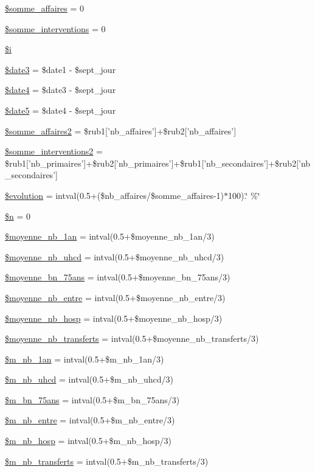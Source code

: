 \begin{CompactItemize}
\item 
\hyperlink{recueil__quotidien_8php_a13}{\$somme\_\-affaires} = 0
\item 
\hyperlink{recueil__quotidien_8php_a14}{\$somme\_\-interventions} = 0
\item 
\hyperlink{recueil__quotidien_8php_a15}{\$i}
\item 
\hyperlink{recueil__quotidien_8php_a16}{\$date3} = \$date1 - \$sept\_\-jour
\item 
\hyperlink{recueil__quotidien_8php_a17}{\$date4} = \$date3 - \$sept\_\-jour
\item 
\hyperlink{recueil__quotidien_8php_a18}{\$date5} = \$date4 - \$sept\_\-jour
\item 
\hyperlink{recueil__quotidien_8php_a19}{\$somme\_\-affaires2} = \$rub1\mbox{[}'nb\_\-affaires'\mbox{]}+\$rub2\mbox{[}'nb\_\-affaires'\mbox{]}
\item 
\hyperlink{recueil__quotidien_8php_a20}{\$somme\_\-interventions2} = \$rub1\mbox{[}'nb\_\-primaires'\mbox{]}+\$rub2\mbox{[}'nb\_\-primaires'\mbox{]}+\$rub1\mbox{[}'nb\_\-secondaires'\mbox{]}+\$rub2\mbox{[}'nb\_\-secondaires'\mbox{]}
\item 
\hyperlink{recueil__quotidien_8php_a21}{\$evolution} = intval(0.5+(\$nb\_\-affaires/\$somme\_\-affaires-1)$\ast$100).\char`\"{} \%\char`\"{}
\item 
\hyperlink{recueil__quotidien_8php_a22}{\$n} = 0
\item 
\hyperlink{recueil__quotidien_8php_a23}{\$moyenne\_\-nb\_\-1an} = intval(0.5+\$moyenne\_\-nb\_\-1an/3)
\item 
\hyperlink{recueil__quotidien_8php_a24}{\$moyenne\_\-nb\_\-uhcd} = intval(0.5+\$moyenne\_\-nb\_\-uhcd/3)
\item 
\hyperlink{recueil__quotidien_8php_a25}{\$moyenne\_\-bn\_\-75ans} = intval(0.5+\$moyenne\_\-bn\_\-75ans/3)
\item 
\hyperlink{recueil__quotidien_8php_a26}{\$moyenne\_\-nb\_\-entre} = intval(0.5+\$moyenne\_\-nb\_\-entre/3)
\item 
\hyperlink{recueil__quotidien_8php_a27}{\$moyenne\_\-nb\_\-hosp} = intval(0.5+\$moyenne\_\-nb\_\-hosp/3)
\item 
\hyperlink{recueil__quotidien_8php_a28}{\$moyenne\_\-nb\_\-transferts} = intval(0.5+\$moyenne\_\-nb\_\-transferts/3)
\item 
\hyperlink{recueil__quotidien_8php_a29}{\$m\_\-nb\_\-1an} = intval(0.5+\$m\_\-nb\_\-1an/3)
\item 
\hyperlink{recueil__quotidien_8php_a30}{\$m\_\-nb\_\-uhcd} = intval(0.5+\$m\_\-nb\_\-uhcd/3)
\item 
\hyperlink{recueil__quotidien_8php_a31}{\$m\_\-bn\_\-75ans} = intval(0.5+\$m\_\-bn\_\-75ans/3)
\item 
\hyperlink{recueil__quotidien_8php_a32}{\$m\_\-nb\_\-entre} = intval(0.5+\$m\_\-nb\_\-entre/3)
\item 
\hyperlink{recueil__quotidien_8php_a33}{\$m\_\-nb\_\-hosp} = intval(0.5+\$m\_\-nb\_\-hosp/3)
\item 
\hyperlink{recueil__quotidien_8php_a34}{\$m\_\-nb\_\-transferts} = intval(0.5+\$m\_\-nb\_\-transferts/3)
\end{CompactItemize}


